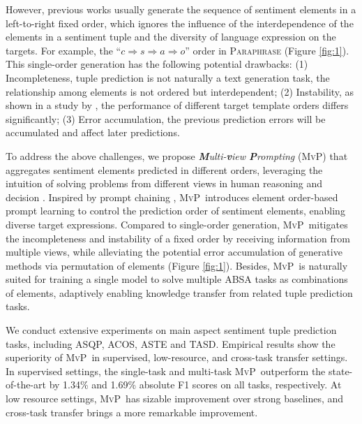 \documentclass[11pt]{article}
\newcommand\mvp{\textsc{MvP}}
\begin{document}
However, previous works usually generate the sequence of sentiment elements in a left-to-right fixed order, which ignores the influence of the interdependence of the elements in a sentiment tuple and the diversity of language expression on the targets.
For example, the ``$c\Rightarrow s \Rightarrow a \Rightarrow o$'' order in \textsc{Paraphrase} \cite{zhang-etal-2021-aspect-sentiment} (Figure \ref{fig:1}). 
This single-order generation has the following potential drawbacks:
(1) Incompleteness, tuple prediction is not naturally a text generation task, the relationship among elements is not ordered but interdependent;
(2) Instability, as shown in a study by \citet{hu-etal-2022-improving-aspect}, the performance of different target template orders differs significantly; 
(3) Error accumulation, the previous prediction errors will be accumulated and affect later predictions.


To address the above challenges, we propose \emph{\textbf{M}ulti-\textbf{v}iew \textbf{P}rompting} (\mvp)
that aggregates sentiment elements predicted in different orders,
leveraging the intuition of solving problems from different views in human reasoning and decision \cite{stanovich2000individual}.
Inspired by prompt chaining \cite{DBLP:journals/corr/abs-2107-13586, DBLP:journals/corr/abs-2201-11903, DBLP:journals/corr/abs-2203-11171, DBLP:journals/corr/abs-2207-00747},
\mvp~introduces element order-based prompt learning
to control the prediction order of sentiment elements, enabling diverse target expressions.
Compared to single-order generation, \mvp~mitigates the incompleteness and instability of a fixed order by receiving information from multiple views, while alleviating the potential error accumulation of generative methods via permutation of elements (Figure \ref{fig:1}).
Besides, \mvp~is naturally suited for training a single model to solve multiple ABSA tasks as combinations of elements, adaptively enabling knowledge transfer from related tuple prediction tasks.




We conduct extensive experiments on main aspect sentiment tuple prediction tasks, including ASQP, ACOS, ASTE and TASD.
Empirical results show the superiority of \mvp~in supervised, low-resource, and cross-task transfer settings.
In supervised settings, the single-task and multi-task \mvp~outperform the state-of-the-art by 1.34\% and 1.69\% absolute F1 scores on all tasks, respectively. 
At low resource settings, \mvp~has sizable improvement over strong baselines, and cross-task transfer brings a more remarkable improvement.
\end{document}
